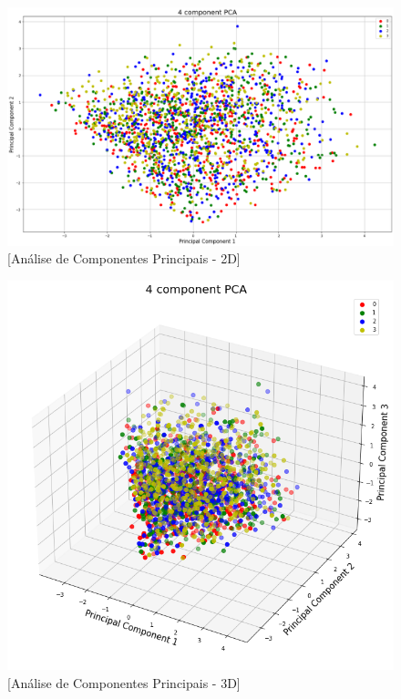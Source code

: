\documentclass[conference]{IEEEtran}
\begin{document}
\begin{figure}[htbp]
    \centerline{\includegraphics[scale=0.2]{xzscore-pca-2d.png}}
    \caption{[Análise de Componentes Principais - 2D]}
    \label{fig:imagem2}
\end{figure}

\begin{figure}[htbp]
    \centerline{\includegraphics[scale=0.4]{xzscore-pca-3d.png}}
    \caption{[Análise de Componentes Principais - 3D]}
    \label{fig:imagem3}
\end{figure}
\end{document}
